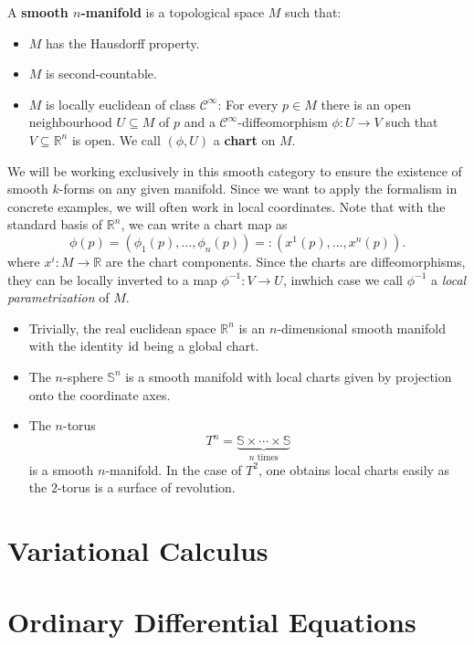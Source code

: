 \begin{definition}
    A \textbf{smooth $n$-manifold} is a topological space $M$ such that:
    \begin{itemize}
        \item $M$ has the Hausdorff property.
        \item $M$ is second-countable.
        \item $M$ is locally euclidean of class $\mathcal{C}^\infty$: For every $p \in M$ there is an open neighbourhood $U \subseteq M$ of $p$ and a $\mathcal{C}^\infty$-diffeomorphism $\phi: U \to V$ such that $V \subseteq \mathbb{R}^n$ is open. We call $(\phi, U)$ a \textbf{chart} on $M$.
    \end{itemize}
\end{definition}
We will be working exclusively in this smooth category to ensure the existence of smooth $k$-forms on any given manifold. Since we want to apply the formalism in concrete examples, we will often work in local coordinates. Note that with the standard basis of $\mathbb{R}^n$, we can write a chart map as 
\[
\phi(p)=(\phi_1(p), \dots, \phi_n(p)) =: (x^1(p), \dots, x^n(p))
.\] where $x^i: M \to \mathbb{R}$ are the chart components. Since the charts are diffeomorphisms, they can be locally inverted to a map $\phi^{-1}: V \to U$, inwhich case we call $\phi^{-1}$ a \emph{local parametrization} of $M$.
\begin{eg}
    \begin{itemize}
        \item Trivially, the real euclidean space $\mathbb{R}^n$ is an $n$-dimensional smooth manifold with the identity $\operatorname{id}$ being a global chart.
        \item The $n$-sphere $\mathbb{S}^n$ is a smooth manifold with local charts given by projection onto the coordinate axes.
    \item The $n$-torus \[T^n = \underbrace{\mathbb{S} \times \cdots \times \mathbb{S}}_{n\text{ times}}\] is a smooth $n$-manifold. In the case of $T^2$, one obtains local charts easily as the $2$-torus is a surface of revolution. 
    \end{itemize}
    
\end{eg}


\section{Variational Calculus}

\section{Ordinary Differential Equations}
